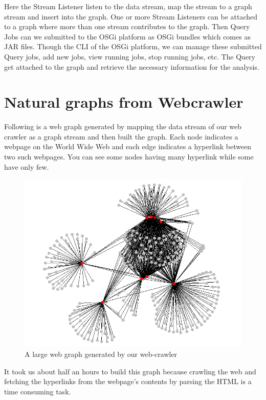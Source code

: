\documentclass[12pt]{report}
\numberwithin{figure}{section}
\numberwithin{table}{section}
\begin{document}
Here the Stream Listener listen to the data stream, map the stream to a graph stream and insert into the graph. One or more Stream Listeners can be attached to a graph where more than one stream contributes to the graph. Then Query Jobs can we submitted to the OSGi platform as OSGi bundles which comes as JAR files. Though the CLI of the OSGi platform, we can manage these submitted Query jobs, add new jobs, view running jobs, stop running jobs, etc. The Query get attached to the graph and retrieve the necessary information for the analysis. 

\section{Natural graphs from Webcrawler}
Following is a web graph generated by mapping the data stream of our web crawler as a graph stream and then built the graph. Each node indicates a webpage on the World Wide Web and each edge indicates a hyperlink between two such webpages. You can see some nodes having many hyperlink while some have only few. 

\begin{figure}[H]
\centering
\includegraphics[scale=0.6]{images/web-graph}
\caption{A large web graph generated by our web-crawler}
\end{figure}

It took us about half an hours to build this graph because crawling the web and fetching the hyperlinks from the webpage’s contents by parsing the HTML is a time consuming task. 

\paragraph{}
\end{document}
